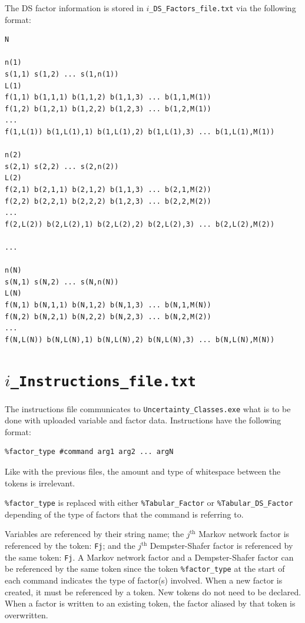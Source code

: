 \documentclass{article}
\begin{document}
The DS factor information is stored in \texttt{$i$\_DS\_Factors\_file.txt} via the following format:
\begin{verbatim}
N

n(1)
s(1,1) s(1,2) ... s(1,n(1))
L(1)
f(1,1) b(1,1,1) b(1,1,2) b(1,1,3) ... b(1,1,M(1))
f(1,2) b(1,2,1) b(1,2,2) b(1,2,3) ... b(1,2,M(1))
...
f(1,L(1)) b(1,L(1),1) b(1,L(1),2) b(1,L(1),3) ... b(1,L(1),M(1))

n(2)
s(2,1) s(2,2) ... s(2,n(2))
L(2)
f(2,1) b(2,1,1) b(2,1,2) b(1,1,3) ... b(2,1,M(2))
f(2,2) b(2,2,1) b(2,2,2) b(1,2,3) ... b(2,2,M(2))
...
f(2,L(2)) b(2,L(2),1) b(2,L(2),2) b(2,L(2),3) ... b(2,L(2),M(2))

...

n(N)
s(N,1) s(N,2) ... s(N,n(N))
L(N)
f(N,1) b(N,1,1) b(N,1,2) b(N,1,3) ... b(N,1,M(N))
f(N,2) b(N,2,1) b(N,2,2) b(N,2,3) ... b(N,2,M(2))
...
f(N,L(N)) b(N,L(N),1) b(N,L(N),2) b(N,L(N),3) ... b(N,L(N),M(N))
\end{verbatim}



\section{\texttt{$i$\_Instructions\_file.txt}}

The instructions file communicates to \texttt{Uncertainty\_Classes.exe} what is to be done with uploaded variable and factor data. Instructions have the following format:
\begin{verbatim}
%factor_type #command arg1 arg2 ... argN
\end{verbatim} 
Like with the previous files, the amount and type of whitespace between the tokens is irrelevant. 

\texttt{\%factor\_type} is replaced with either \texttt{\%Tabular\_Factor} or \texttt{\%Tabular\_DS\_Factor} depending of the type of factors that the command is referring to.

Variables are referenced by their string name; the $j^\text{th}$ Markov network factor is referenced by the token: \texttt{Fj}; and the $j^\text{th}$ Dempster-Shafer factor is referenced by the same token: \texttt{Fj}. A Markov network factor and a Dempster-Shafer factor can be referenced by the same token since the token \texttt{\%factor\_type} at the start of each command indicates the type of factor(s) involved. When a new factor is created, it must be referenced by a token. New tokens do not need to be declared. When a factor is written to an existing token, the factor aliased by that token is overwritten.
\end{document}
